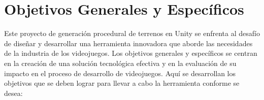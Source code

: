 

\section{Objetivos Generales y Específicos}

Este proyecto de generación procedural de terrenos en Unity se enfrenta al desafío de diseñar y desarrollar una herramienta innovadora que aborde las necesidades de la industria de los videojuegos. Los objetivos generales y específicos se centran en la creación de una solución tecnológica efectiva y en la evaluación de su impacto en el proceso de desarrollo de videojuegos. Aquí se desarrollan los objetivos que se deben lograr para llevar a cabo la herramienta conforme se desea:

